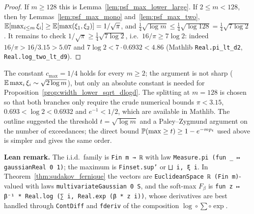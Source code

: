 \begin{proof}
\leanok
{}
If $m\ge128$ this is Lemma~\ref{lem:psf_max_lower_large}. If $2\le m<128$, then by
Lemmas~\ref{lem:psf_max_mono} and~\ref{lem:psf_max_two},
$\mathbb{E}[\max_{i\le m}\xi_i]\ge\mathbb{E}[\max(\xi_1,\xi_2)] = 1/\sqrt\pi$, and
$\frac14\sqrt{\log m} \le \frac14\sqrt{\log 128} = \frac14\sqrt{7\log2}$. It remains to check
$1/\sqrt\pi\ge\frac14\sqrt{7\log2}$, i.e.\ $16/\pi\ge7\log2$: indeed $16/\pi > 16/3.15 > 5.07$
and $7\log 2 < 7\cdot0.6932 < 4.86$ (Mathlib \texttt{Real.pi\_lt\_d2},
\texttt{Real.log\_two\_lt\_d9}).
\end{proof}

\begin{remark}[Constants]\label{rem:psf_constants}
The constant $c_{\max} = 1/4$ holds for every $m\ge2$; the argument is not sharp
($\mathbb{E}\max_i\xi_i\sim\sqrt{2\log m}$), but only an absolute constant is needed for
Proposition~\ref{prop:width_lower_sqrt_dlogd}. The splitting at $m = 128$ is chosen so that
both branches only require the crude numerical bounds $\pi<3.15$, $0.693<\log2<0.6932$ and
$e^{-1}<1/2$, which are available in Mathlib. The outline suggested the threshold
$t = \sqrt{\log m}$ and a Paley--Zygmund argument on the number of exceedances; the direct
bound $\mathbb{P}(\max\ge t)\ge1-e^{-mp_t}$ used above is simpler and gives the same order.
\end{remark}

\textbf{Lean remark.} The i.i.d.\ family is \texttt{Fin m → ℝ} with law
\texttt{Measure.pi (fun \_ ↦ gaussianReal 0 1)}; the maximum is \texttt{Finset.sup'} or
\texttt{⨆ i, ξ i}. In Theorem~\ref{thm:sudakov_fernique} the vectors are
\texttt{EuclideanSpace ℝ (Fin m)}-valued with laws \texttt{multivariateGaussian 0 S}, and the
soft-max $F_\beta$ is \texttt{fun z ↦ β⁻¹ * Real.log (∑ i, Real.exp (β * z i))}, whose
derivatives are best handled through \texttt{ContDiff} and \texttt{fderiv} of the composition
$\log\circ\sum\circ\exp$.
